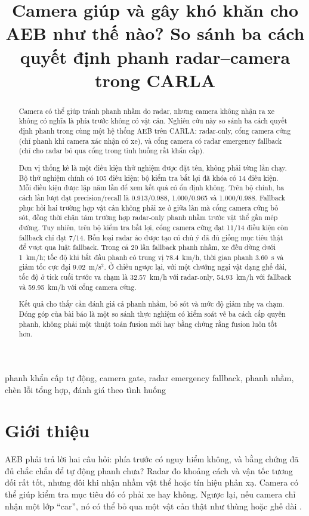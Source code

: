 \documentclass[conference]{IEEEtran}
\title{Camera giúp và gây khó khăn cho AEB như thế nào? So sánh ba cách quyết định phanh radar--camera trong CARLA}
\author{
\IEEEauthorblockN{Mai Việt Hoàng và Phạm Đức An}
\IEEEauthorblockA{\textit{Đại học Bách khoa Hà Nội}\\
Hà Nội, Việt Nam\\hoangmai04222@gmail.com}
}
\begin{document}
\maketitle

\begin{abstract}
Camera có thể giúp tránh phanh nhầm do radar, nhưng camera không nhận ra xe
không có nghĩa là phía trước không có vật cản. Nghiên cứu này so sánh ba cách
quyết định phanh trong cùng một hệ thống AEB trên CARLA: radar-only, cổng
camera cứng (chỉ phanh khi camera xác nhận có xe), và cổng camera có radar
emergency fallback (chỉ cho radar bỏ qua cổng trong tình huống rất khẩn cấp).

Đơn vị thống kê là một điều kiện thử nghiệm được đặt tên, không phải từng lần
chạy. Bộ thử nghiệm chính có 105 điều kiện; bộ kiểm tra bất lợi đã khóa có 14
điều kiện. Mỗi điều kiện được lặp năm lần để xem kết quả có ổn định không.
Trên bộ chính, ba cách lần lượt đạt precision/recall là 0.913/0.988,
1.000/0.965 và 1.000/0.988. Fallback phục hồi hai trường hợp vật cản không
phải xe ở giữa làn mà cổng camera cứng bỏ sót, đồng thời chặn tám trường hợp
radar-only phanh nhầm trước vật thể gần mép đường. Tuy nhiên, trên bộ kiểm tra
bất lợi, cổng camera cứng đạt 11/14 điều kiện còn fallback chỉ đạt 7/14. Bốn
loại radar ảo được tạo có chủ ý đã đủ giống mục tiêu thật để vượt qua luật
fallback. Trong cả 20 lần fallback phanh nhầm, xe đều dừng dưới 1~km/h; tốc độ
khi bắt đầu phanh có trung vị 78.4~km/h, thời gian phanh 3.60~s và giảm tốc
cực đại 9.02~m/s$^2$. Ở chiều ngược lại, với một chướng ngại vật dạng ghế dài,
tốc độ ở tick cuối trước va chạm là 32.57~km/h với radar-only, 54.93~km/h với
fallback và 59.95~km/h với cổng camera cứng.

Kết quả cho thấy cần đánh giá cả phanh nhầm, bỏ sót và mức độ giảm nhẹ va chạm.
Đóng góp của bài báo là một so sánh thực nghiệm có kiểm soát về ba cách cấp
quyền phanh, không phải một thuật toán fusion mới hay bằng chứng rằng fusion
luôn tốt hơn.
\end{abstract}
\begin{IEEEkeywords}
phanh khẩn cấp tự động, camera gate, radar emergency fallback,
phanh nhầm, chèn lỗi tổng hợp, đánh giá theo tình huống
\end{IEEEkeywords}

\section{Giới thiệu}
AEB phải trả lời hai câu hỏi: phía trước có nguy hiểm không, và bằng chứng đã
đủ chắc chắn để tự động phanh chưa? Radar đo khoảng cách và vận tốc tương đối
rất tốt, nhưng đôi khi nhận nhầm vật thể hoặc tín hiệu phản xạ. Camera có thể
giúp kiểm tra mục tiêu đó có phải xe hay không. Ngược lại, nếu camera chỉ nhận
một lớp ``car'', nó có thể bỏ qua một vật cản thật như thùng hoặc ghế dài
\cite{yang2022aebreview}.
\end{document}
